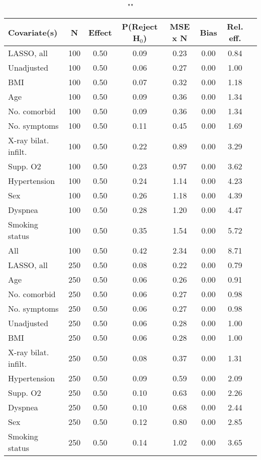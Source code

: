 \documentclass{article}
\begin{document}
{\tabcolsep=6pt  %
\begin{longtable}{lccccccc}
\caption{""} \\
Covariate(s) & N & Effect & P(Reject H$_0$) & MSE x N & Bias & Rel. eff.\\ \midrule
LASSO, all & 100 & 0.50 & 0.09 & 0.23 & 0.00 & 0.84 \\ 
Unadjusted & 100 & 0.50 & 0.06 & 0.27 & 0.00 & 1.00 \\ 
BMI & 100 & 0.50 & 0.07 & 0.32 & 0.00 & 1.18 \\ 
Age & 100 & 0.50 & 0.09 & 0.36 & 0.00 & 1.34 \\ 
No. comorbid & 100 & 0.50 & 0.09 & 0.36 & 0.00 & 1.34 \\ 
No. symptoms & 100 & 0.50 & 0.11 & 0.45 & 0.00 & 1.69 \\ 
X-ray bilat. infilt. & 100 & 0.50 & 0.22 & 0.89 & 0.00 & 3.29 \\ 
Supp. O2 & 100 & 0.50 & 0.23 & 0.97 & 0.00 & 3.62 \\ 
Hypertension & 100 & 0.50 & 0.24 & 1.14 & 0.00 & 4.23 \\ 
Sex & 100 & 0.50 & 0.26 & 1.18 & 0.00 & 4.39 \\ 
Dyspnea & 100 & 0.50 & 0.28 & 1.20 & 0.00 & 4.47 \\ 
Smoking status & 100 & 0.50 & 0.35 & 1.54 & 0.00 & 5.72 \\ 
All & 100 & 0.50 & 0.42 & 2.34 & 0.00 & 8.71 \\ \midrule 
LASSO, all & 250 & 0.50 & 0.08 & 0.22 & 0.00 & 0.79 \\ 
Age & 250 & 0.50 & 0.06 & 0.26 & 0.00 & 0.91 \\ 
No. comorbid & 250 & 0.50 & 0.06 & 0.27 & 0.00 & 0.98 \\ 
No. symptoms & 250 & 0.50 & 0.06 & 0.27 & 0.00 & 0.98 \\ 
Unadjusted & 250 & 0.50 & 0.06 & 0.28 & 0.00 & 1.00 \\ 
BMI & 250 & 0.50 & 0.06 & 0.28 & 0.00 & 1.00 \\ 
X-ray bilat. infilt. & 250 & 0.50 & 0.08 & 0.37 & 0.00 & 1.31 \\ 
Hypertension & 250 & 0.50 & 0.09 & 0.59 & 0.00 & 2.09 \\ 
Supp. O2 & 250 & 0.50 & 0.10 & 0.63 & 0.00 & 2.26 \\ 
Dyspnea & 250 & 0.50 & 0.10 & 0.68 & 0.00 & 2.44 \\ 
Sex & 250 & 0.50 & 0.12 & 0.80 & 0.00 & 2.85 \\ 
Smoking status & 250 & 0.50 & 0.14 & 1.02 & 0.00 & 3.65 \\ 

\end{longtable}}
\end{document}
